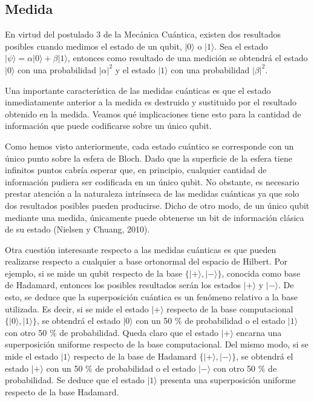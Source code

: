 \subsection{Medida}

En virtud del postulado 3 de la Mecánica Cuántica, existen dos resultados posibles cuando medimos el estado de un qubit, $ |0 \rangle $ o $ | 1 \rangle$. Sea el estado $ | \psi \rangle = \alpha | 0 \rangle + \beta | 1 \rangle$, entonces como resultado de una medición se obtendrá el estado $| 0 \rangle$ con una probabilidad $ | \alpha|^2$ y el estado $ | 1 \rangle $ con una probabilidad $ | \beta |^2$.

Una importante característica de las medidas cuánticas es que el estado inmediatamente anterior a la medida es destruido y sustituido por el resultado obtenido en la medida. Veamos qué implicaciones tiene esto para la cantidad de información que puede codificarse sobre un único qubit.

Como hemos visto anteriormente, cada estado cuántico se corresponde con un único punto sobre la esfera de Bloch. Dado que la superficie de la esfera tiene infinitos puntos cabría esperar que, en principio, cualquier cantidad de información pudiera ser codificada en un único qubit. No obstante, es necesario prestar atención a la naturaleza intrínseca de las medidas cuánticas ya que solo dos resultados posibles pueden producirse. Dicho de otro modo, de un único qubit mediante una medida, únicamente puede obtenerse un bit de información clásica de su estado (Nielsen y Chuang, 2010).

Otra cuestión interesante respecto a las medidas cuánticas es que pueden realizarse respecto a cualquier a base ortonormal del espacio de Hilbert. Por ejemplo, si se mide un qubit respecto de la base $\{ |+ \rangle, | - \rangle \}$, conocida como base de Hadamard, entonces los posibles resultados serán los estados $ | + \rangle$ y $ | - \rangle $. De esto, se deduce que la superposición cuántica es un fenómeno relativo a la base utilizada. Es decir, si se mide el estado $| + \rangle $ respecto de la base computacional $\{ |0 \rangle, | 1 \rangle \}$, se obtendrá el estado $ | 0 \rangle $ con un 50 $ \% $ de probabilidad o el estado $ | 1 \rangle $ con otro 50 $ \% $ de probabilidad. Queda claro que el estado $ | + \rangle $ encarna una superposición uniforme respecto de la base computacional. Del mismo modo, si se mide el estado $| 1 \rangle $ respecto de la base de Hadamard $\{ |+ \rangle, | - \rangle \}$, se obtendrá el estado $ | + \rangle $ con un 50 $ \% $ de probabilidad o el estado $ | - \rangle $ con otro 50 $ \% $ de probabilidad. Se deduce que el estado $ | 1 \rangle $ presenta una superposición uniforme respecto de la base Hadamard.

